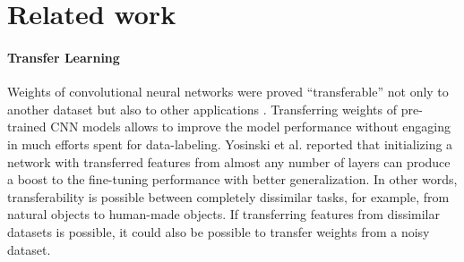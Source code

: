 \section{Related work}
\label{sec:related}

%



\paragraph{Transfer Learning}


Weights of convolutional neural networks were proved ``transferable'' not only to another dataset \cite{shin2016deep,yosinski2014transferable} but also to other applications \cite{girshick2014rich,long2015fully}.
Transferring weights of pre-trained CNN models allows to improve the model performance without engaging in much efforts spent for data-labeling. \cite{pan2010survey}
Yosinski et al. \cite{yosinski2014transferable} reported that initializing a network with transferred features from almost any number of layers can produce a boost to the fine-tuning performance with better generalization.
In other words, transferability is possible between completely dissimilar tasks, for example, from natural objects to human-made objects.
If transferring features from dissimilar datasets is possible,  it could also be possible to transfer weights from a noisy dataset.

